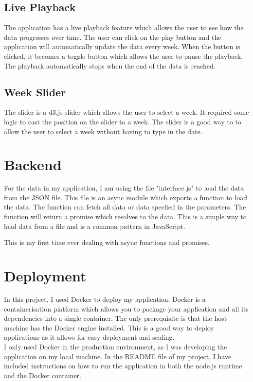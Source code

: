 \documentclass{report}
\begin{document}
\subsection{Live Playback}
The application has a live playback feature which allows the user to see how the data progresses over time. The user can click on the play button and the application will automatically update the data every week. When the button is clicked, it becomes a toggle button which allows the user to pause the playback. The playback automatically stops when the end of the data is reached.

\subsection{Week Slider}
The slider is a d3.js slider which allows the user to select a week. It required some logic to cast the position on the slider to a week. The slider is a good way to to allow the user to select a week without having to type in the date.

\section{Backend}
For the data in my application, I am using the file "interface.js" to load the data from the JSON file. This file is an async module which exports a function to load the data. The function can fetch all data or data specfied in the parameters. The function will return a promise which resolves to the data. This is a simple way to load data from a file and is a common pattern in JavaScript.

This is my first time ever dealing with async functions and promises.

\section{Deployment}
In this project, I used Docker to deploy my application. Docker is a containerisation platform which allows you to package your application and all its dependencies into a single container. The only prerequisite is that the host machine has the Docker engine installed. This is a good way to deploy applications as it allows for easy deployment and scaling.\\

I only used Docker in the production environment, as I was developing the application on my local machine. In the README file of my project, I have included instructions on how to run the application in both the node.js runtime and the Docker container.\\
\end{document}
